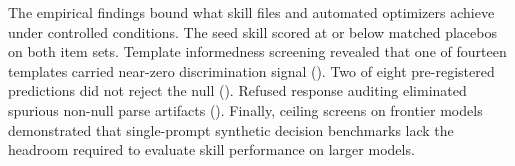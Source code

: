 The empirical findings bound what skill files and automated optimizers achieve
under controlled conditions. The seed skill scored at or below matched
placebos on both item sets. Template informedness screening revealed that one of
fourteen templates carried near-zero discrimination signal ().
Two of eight pre-registered predictions did not reject the null
(). Refused response auditing eliminated spurious
non-null parse artifacts (). Finally, ceiling screens on
frontier models demonstrated that single-prompt synthetic decision benchmarks
lack the headroom required to evaluate skill performance on larger models.
